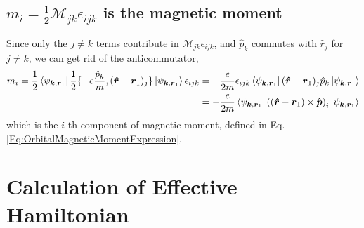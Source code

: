 \documentclass{report}
\renewcommand\vec[1]{\ensuremath\boldsymbol{#1}} %
\begin{document}
\section{$m_i = \frac{1}{2} \mathcal{M}_{jk}  \epsilon_{ijk}$ is the magnetic moment}
Since only the $j\neq k$ terms contribute in $\mathcal{M}_{jk} \epsilon_{ijk}$, and $\hat{p}_k$ commutes with $\hat{r}_j$ for $j\neq k$, we can get rid of the anticommutator,
$$
\begin{aligned}
	m_i = \frac{1}{2}\bra{\psi_{\vec{k},\vec{r}_1}} \frac{1}{2}\{-e\frac{\hat{p}_k}{m}, (\vec{\hat{r}} - \vec{r}_1)_j\} \ket{\psi_{\vec{k},\vec{r}_1}} \epsilon_{ijk} & = -\frac{e}{2m} \epsilon_{ijk} \bra{\psi_{\vec{k},\vec{r}_1}}(\vec{\hat{r}} - \vec{r}_1)_j \hat{p}_k  \ket{\psi_{\vec{k},\vec{r}_1}} \\
	& = -\frac{e}{2m}  \bra{\psi_{\vec{k},\vec{r}_1}}\left((\vec{\hat{r}} - \vec{r}_1) \times \hat{\vec{p}}\right)_i \ket{\psi_{\vec{k},\vec{r}_1}}
\end{aligned}
$$
which is the $i$-th component of magnetic moment, defined in Eq. \eqref{Eq:OrbitalMagneticMomentExpression}.

\chapter{Calculation of Effective Hamiltonian}\label{app:EffHamiltonian}
%
\printbibliography
\end{document}
